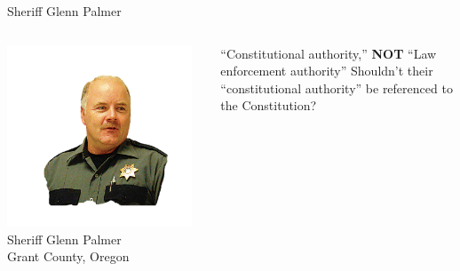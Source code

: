 \begin{frame}{Sheriff Glenn Palmer}
    \begin{columns}[onlytextwidth]
            \centering
            \includegraphics[width=0.95\textwidth]{img/glenn-palmer.png}
            \\ Sheriff Glenn Palmer
            \\ Grant County, Oregon

            { \Large
                ``Constitutional authority,'' \textbf{NOT} ``Law enforcement authority''
                \pause
                Shouldn't their ``constitutional authority'' be referenced to the Constitution?
            }
    \end{columns}
\end{frame}


